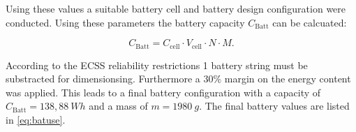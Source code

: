 \begin{table}[htb]
\centering
{}
\caption{Power consumption mode used as design case for the battery sizing.}
\label{tab:batsize}
\end{table}

Using these values a suitable battery cell and battery design configuration were conducted. Using these parameters the battery capacity $C_\text{Batt}$ can be calcuated:

\begin{equation}
C_\text{Batt} = C_\text{cell} \cdot V_\text{cell} \cdot N \cdot M .
\label{eq:batuse}
\end{equation}

According to the ECSS reliability restrictions 1 battery string must be substracted for dimensionsing. Furthermore a $30 \%$ margin on the energy content was applied. This leads to a final battery configuration with a capacity of $C_\text{Batt}=138,88 \ Wh$ and a mass of $m = 1980 \ g$. The final battery values are listed in \autoref{eq:batuse}.


